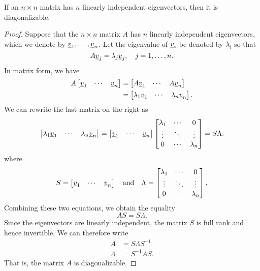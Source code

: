 \begin{theorem}
If an $n \times n$ matrix has $n$ linearly independent eigenvectors, then it is diagonalizable.
\end{theorem}
\begin{proof}
Suppose that the $n \times n$ matrix $A$ has $n$ linearly independent eigenvectors, which we denote by $\underline{v}_1, \ldots, \underline{v}_n$.
Let the eigenvalue of $\underline{v}_i$ be denoted by $\lambda_i$ so that
\begin{equation*}
A \underline{v}_j = \lambda_j \underline{v}_j, \quad j = 1, \ldots, n.
\end{equation*}
In matrix form, we have
\begin{equation*}
\begin{split}
A \begin{bmatrix} \underline{v}_1 & \cdots & \underline{v}_n \end{bmatrix}
&= \begin{bmatrix} A \underline{v}_1 & \cdots & A \underline{v}_n \end{bmatrix} \\
&= \begin{bmatrix} \lambda_1 \underline{v}_1 & \cdots & \lambda_n \underline{v}_n \end{bmatrix} .
\end{split}
\end{equation*}
We can rewrite the last matrix on the right as
\begin{equation*}
\begin{bmatrix} \lambda_1 \underline{v}_1 & \cdots & \lambda_n \underline{v}_n \end{bmatrix}
= \begin{bmatrix} \underline{v}_1 & \cdots & \underline{v}_n \end{bmatrix}
\begin{bmatrix}
\lambda_1 & \cdots & 0 \\
\vdots & \ddots & \vdots \\
0 & \cdots & \lambda_n
\end{bmatrix}
= S \Lambda .
\end{equation*}
where
\begin{equation*}
S = \begin{bmatrix} \underline{v}_1 & \cdots & \underline{v}_n \end{bmatrix}
\quad \text{and} \quad
\Lambda = \begin{bmatrix}
\lambda_1 & \cdots & 0 \\
\vdots & \ddots & \vdots \\
0 & \cdots & \lambda_n
\end{bmatrix} ,
\end{equation*}
Combining these two equations, we obtain the equality
\begin{equation*}
A S = S \Lambda .
\end{equation*}
Since the eigenvectors are linearly independent, the matrix $S$ is full rank and hence invertible.
We can therefore write
\begin{align*}
A &= S \Lambda S^{-1} \\
\Lambda &= S^{-1} A S .
\end{align*}
That is, the matrix $A$ is diagonalizable.
\end{proof}

